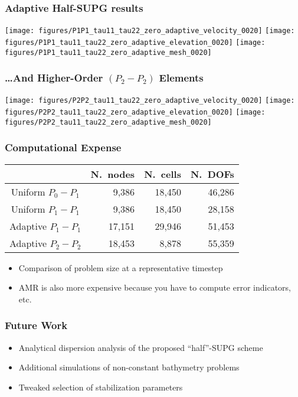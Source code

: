\begin{frame}[t]
  \frametitle{Adaptive Half-SUPG results}
\vspace{-0.2in}
  \begin{center}
    {
      \texttt{[image: figures/P1P1\_tau11\_tau22\_zero\_adaptive\_velocity\_0020]}
    }
    {
      \texttt{[image: figures/P1P1\_tau11\_tau22\_zero\_adaptive\_elevation\_0020]}
    }
    {
      \texttt{[image: figures/P1P1\_tau11\_tau22\_zero\_adaptive\_mesh\_0020]}
    }
  \end{center}
\end{frame}


\begin{frame}[t]
  \frametitle{\ldots And Higher-Order $\left(P_2-P_2\right)$ Elements}
\vspace{-0.2in}
  \begin{center}
    {
      \texttt{[image: figures/P2P2\_tau11\_tau22\_zero\_adaptive\_velocity\_0020]}
    }
    {
      \texttt{[image: figures/P2P2\_tau11\_tau22\_zero\_adaptive\_elevation\_0020]}
    }
    {
      \texttt{[image: figures/P2P2\_tau11\_tau22\_zero\_adaptive\_mesh\_0020]}
    }
  \end{center}
\end{frame}



\begin{frame}[t]
  \frametitle{Computational Expense}
  \begin{center}
    \renewcommand{\arraystretch}{1.2}
    \begin{tabular}{|c|r|r|r|} \hline
                     &  N.~nodes & N.~cells &  N.~DOFs \\ \hline
    Uniform  $P_0-P_1$  &  9,386    & 18,450   &  46,286  \\ \hline
    Uniform  $P_1-P_1$  &  9,386    & 18,450   &  28,158  \\ \hline
    Adaptive $P_1-P_1$  &  17,151   & 29,946   &  51,453  \\ \hline
    Adaptive $P_2-P_2$  &  18,453   & 8,878    &  55,359 \\ \hline
  \end{tabular}
  \end{center}
  \begin{itemize}
    \item{Comparison of problem size at a representative timestep}
    \item{AMR is also more expensive because you have to compute error indicators, etc.}
  \end{itemize}
\end{frame}

\begin{frame}
  \frametitle{Future Work}
  \begin{itemize}
  \item{Analytical dispersion analysis of the proposed ``half''-SUPG scheme}
  \item{Additional simulations of non-constant bathymetry problems}
  \item{Tweaked selection of stabilization parameters}
  \end{itemize}
\end{frame}

